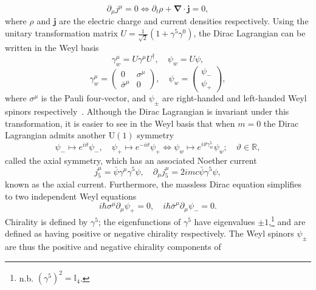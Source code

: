 \documentclass[11pt, a4paper]{article}
\begin{document}
\begin{equation}
  \partial_\mu j^\mu = 0 \iff \partial_t \rho + \bm{\nabla\!\cdot j} = 0,
\end{equation}
where $\rho$ and $\bm{j}$ are the electric charge and current densities respectively.
Using the unitary transformation matrix $U = \frac{1}{\sqrt{2}}(1 + \gamma^5 \gamma^0)$,
the Dirac Lagrangian can be written in the Weyl basis
\begin{equation}
  \gamma^\mu_w = U\gamma^\mu U^\dagger, \quad \psi_w = U \psi,
\end{equation}
\begin{equation}
  \gamma^\mu_w = \begin{pmatrix} 0 & \sigma^\mu \\ \bar{\sigma}^\mu & 0 \end{pmatrix}, \quad 
  \psi_w = \begin{pmatrix} \psi_- \\ \psi_+  \end{pmatrix},
\end{equation}
where $\sigma^\mu$ is the Pauli four-vector, and $\psi_\pm$ are right-handed and left-handed
Weyl spinors respectively~\cite{Weyl-tran}.
Although the Dirac Lagrangian is invariant under this transformation, it is easier to see
in the Weyl basis that when $m=0$ the Dirac Lagrangian admits another $\mathrm{U}(1)$ symmetry
\begin{equation}
  \psi_- \mapsto e^{i\vartheta}\psi_- , \quad
  \psi_+ \mapsto e^{-i\vartheta}\psi_+  \iff
  \psi_w \mapsto e^{i\vartheta\gamma_w^5}\psi_w; \quad \vartheta \in \mathbb{R},
\end{equation}
called the axial symmetry, which has an associated Noether current
\begin{equation}
  j^\mu_5 = \bar{\psi}\gamma^\mu\gamma^5\psi, \quad \partial_\mu j^\mu_5 = 2imc\bar{\psi}\gamma^5\psi,
\end{equation}
known as the axial current.
Furthermore, the massless Dirac equation simplifies to two independent
Weyl equations~\cite{Weyl-tran}
\begin{equation}
  i\hbar\sigma^\mu\partial_\mu \psi_+ = 0, \quad
  i\hbar\bar{\sigma}^\mu\partial_\mu\psi_- =0.
\end{equation}
Chirality is defined by $\gamma^5$; the eigenfunctions of $\gamma^5$
have eigenvalues $\pm 1$,\footnote{n.b. ${(\gamma^5)}^2 = \mathbb{I}_4$.}
and are defined as having positive or negative chirality respectively.
The Weyl spinors $\psi_\pm$ are thus the positive and negative chirality components of
\end{document}
